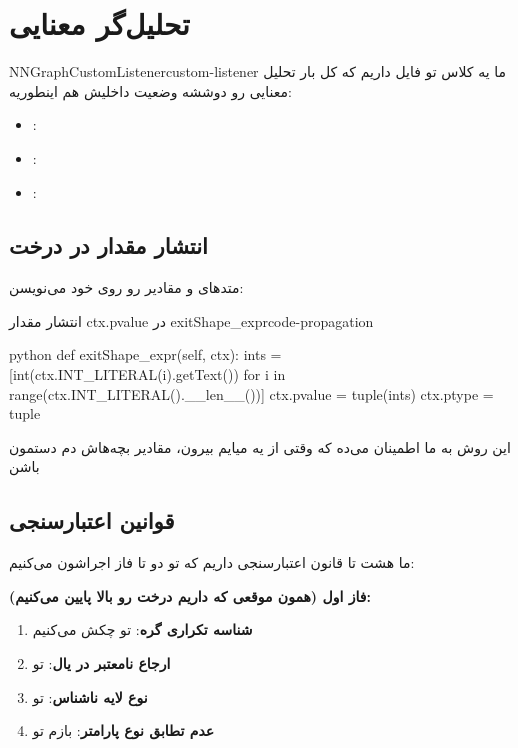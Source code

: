 \documentclass{nngraph-fa}
\begin{document}
\section{تحلیل‌گر معنایی}

\begin{dfnbox}{NNGraphCustomListener}{custom-listener}
ما یه کلاس  تو فایل  داریم که کل بار تحلیل معنایی رو دوششه
وضعیت داخلیش هم اینطوریه:
\begin{itemize}[noitemsep]
    \item {}: 
    \item {}: 
    \item {}: 
\end{itemize}
\end{dfnbox}

\subsection{انتشار مقدار در درخت}

متدهای  و  مقادیر رو روی خود  می‌نویسن:

\begin{codebox}{انتشار مقدار ctx.pvalue در exitShape\_expr}{code-propagation}
\begin{amzcode}{python}
def exitShape_expr(self, ctx):
    ints = [int(ctx.INT_LITERAL(i).getText())
            for i in range(ctx.INT_LITERAL().__len__())]
    ctx.pvalue = tuple(ints)
    ctx.ptype  = tuple
\end{amzcode}
\end{codebox}

این روش به ما اطمینان می‌ده که وقتی از یه  میایم بیرون، مقادیر بچه‌هاش دم دستمون باشن

\subsection{قوانین اعتبارسنجی}

ما هشت تا قانون اعتبارسنجی داریم که تو دو تا فاز اجراشون می‌کنیم:

\textbf{فاز اول (همون موقعی که داریم درخت رو بالا پایین می‌کنیم):}
\begin{enumerate}
    \item \textbf{شناسه تکراری گره}: تو  چکش می‌کنیم
    \item \textbf{ارجاع نامعتبر در یال}: تو 
    \item \textbf{نوع لایه ناشناس}: تو 
    \item \textbf{عدم تطابق نوع پارامتر}: بازم تو 
\end{enumerate}
\end{document}
